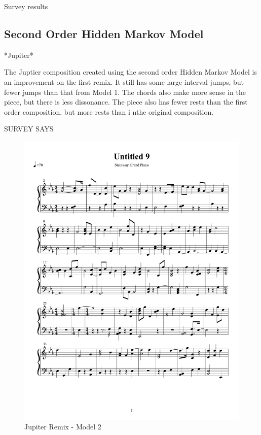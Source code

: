 \documentclass{article} %
\begin{document}
Survey results

\subsection{Second Order Hidden Markov Model}

*Jupiter*

The Juptier composition created using the second order Hidden Markov Model is an improvement on the first remix. It still has some large interval jumps, but fewer jumps than that from Model 1. The chords also make more sense in the piece, but there is less dissonance. The piece also has fewer rests than the first order composition, but more rests than i nthe original composition.

SURVEY SAYS


\begin{figure}[H]
\centering
\caption{Jupiter Remix - Model 2}
\includegraphics [scale = 0.6] {JupiterRemix2-cropped.pdf}
\end{figure}
\end{document}
